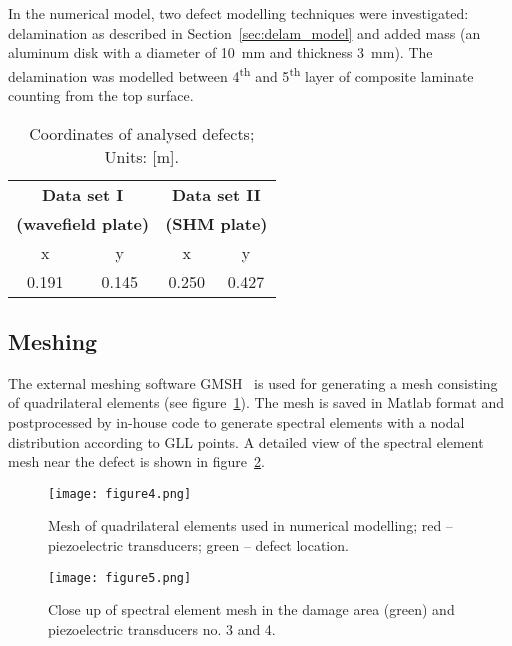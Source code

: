 \documentclass[12pt]{iopart}
\begin{document}
In the numerical model, two defect modelling techniques were investigated: delamination as described in Section~\ref{sec:delam_model} and added mass (an aluminum disk with a diameter of 10~mm and thickness 3~mm). The delamination was modelled between 4\textsuperscript{th} and 5\textsuperscript{th} layer of composite laminate counting from the top surface.
\begin{table}
	\caption{Coordinates of analysed defects; Units: [m].}
	\begin{indented}
	\item[]\begin{tabular}{cccc} 
		\toprule
		\multicolumn{2}{c}{\textbf{Data set I} }	& \multicolumn{2}{c}{\textbf{Data set II} } \\
		\multicolumn{2}{c}{\textbf{(wavefield plate)} }	& \multicolumn{2}{c}{\textbf{(SHM plate)} } \\
		\cmidrule(lr){1-2} \cmidrule(lr){3-4}
		x & y &  x &  y  \\
		0.191 & 0.145 & 0.250  & 0.427 \\ 
		\bottomrule 
	\end{tabular} 
	\end{indented}
	\label{tab:defect_coordinates}
\end{table}	
	
\subsection{Meshing}
The external meshing software GMSH~\cite{Geuzaine2009} is used for generating a mesh consisting of quadrilateral elements (see figure~\ref{fig:quad_mesh}). The mesh is saved in Matlab format and postprocessed by in-house code to generate spectral elements with a nodal distribution according to GLL points. A detailed view of the spectral element mesh near the defect is shown in figure~\ref{fig:spec_mesh_zoom}. 
\begin{figure} [h!]
	\centering
	\texttt{[image: figure4.png]}	
	\caption{Mesh of quadrilateral elements used in numerical modelling; red -- piezoelectric transducers; green -- defect location.}
	\label{fig:quad_mesh}
\end{figure}
\begin{figure} [h!]
	\centering
	\texttt{[image: figure5.png]}	
	\caption{Close up of spectral element mesh in the damage area (green) and piezoelectric transducers no. 3 and 4.}
	\label{fig:spec_mesh_zoom}
\end{figure}
\clearpage
\end{document}
